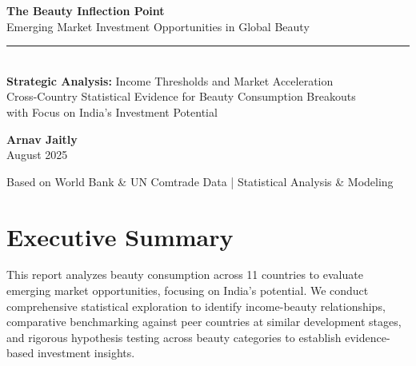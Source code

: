 \documentclass[11pt]{article}
\begin{document}
\begin{titlepage}
\centering
\vspace*{1.5cm}

{\Huge\bfseries\color{darkblue} The Beauty Inflection Point}\\[0.4cm]
{\LARGE\color{darkred} Emerging Market Investment Opportunities in Global Beauty}\\[0.8cm]

\rule{0.8\textwidth}{2pt}\\[1cm]

{\large\textbf{Strategic Analysis:} Income Thresholds and Market Acceleration}\\[0.5cm]
{\normalsize Cross-Country Statistical Evidence for Beauty Consumption Breakouts}\\[0.3cm]
{\normalsize with Focus on India's Investment Potential}\\[1.5cm]

\vspace{10cm}

{\Large\textbf{Arnav Jaitly}}\\[0.3cm]
{\normalsize August 2025}

\vfill

{\footnotesize Based on World Bank \& UN Comtrade Data | Statistical Analysis \& Modeling}

\end{titlepage}

\newpage

\section*{Executive Summary}

This report analyzes beauty consumption across 11 countries to evaluate emerging market opportunities, focusing on India's potential. We conduct comprehensive statistical exploration to identify income-beauty relationships, comparative benchmarking against peer countries at similar development stages, and rigorous hypothesis testing across beauty categories to establish evidence-based investment insights.
\end{document}
